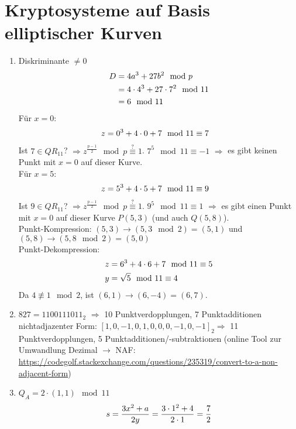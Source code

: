 \documentclass{article}
\begin{document}
	\section*{Kryptosysteme auf Basis elliptischer Kurven}
	\begin{enumerate}[label=(\alph*)]
		\item Diskriminante $\neq 0$
		\begin{align}
			D &= 4a^3 + 27b^2 \mod p \notag \\
			&= 4\cdot 4^3 + 27\cdot 7^2\mod 11 \notag \\
			&= 6 \mod 11 \notag
		\end{align}
		Für $x = 0$:
		\begin{align}
			z &= 0^3 + 4\cdot 0 + 7 \mod 11 \equiv 7 \notag
		\end{align}
		Ist $7\in QR_{11}$? $\Rightarrow z^{\frac{p-1}{2}}\mod p\overset{?}{\equiv} 1$. $7^5\mod 11\equiv -1$ $\Rightarrow$ es gibt keinen Punkt mit $x=0$ auf dieser Kurve. \\
		Für $x=5$:
		\begin{align}
			z &= 5^3 + 4\cdot 5 + 7 \mod 11 \equiv 9 \notag
		\end{align}
		Ist $9\in QR_{11}$? $\Rightarrow z^{\frac{p-1}{2}}\mod p\overset{?}{\equiv} 1$. $9^5\mod 11\equiv 1$ $\Rightarrow$ es gibt einen Punkt mit $x=0$ auf dieser Kurve $P(5, 3)$ (und auch $Q(5,8)$). \\
		Punkt-Kompression: $(5,3) \to (5,3\mod 2) = (5,1)$ und $(5,8)\to(5,8\mod 2) = (5,0)$ \\
		Punkt-Dekompression:
		\begin{align}
			z &= 6^3 + 4\cdot 6 + 7 \mod 11 \equiv 5 \notag \\
			y &= \sqrt{5} \mod 11 \equiv 4 \notag
		\end{align}
		Da $4\not\equiv 1 \mod 2$, ist $(6,1)\to (6,-4) = (6,7)$.
		\item $827 = 1100111011_2$ $\Rightarrow$ 10 Punktverdopplungen, 7 Punktadditionen \\
		nichtadjazenter Form: $[1,0,-1,0,1,0,0,0,-1,0,-1]_2 \Rightarrow$ 11 Punktverdopplungen, 5 Punktadditionen/-subtraktionen (online Tool zur Umwandlung Dezimal $\to$ NAF: \url{https://codegolf.stackexchange.com/questions/235319/convert-to-a-non-adjacent-form})
		\item $Q_A = 2\cdot (1,1)\mod 11$
		\begin{align}
			s &= \frac{3x^2 + a}{2y} = \frac{3\cdot 1^2 + 4}{2\cdot 1} = \frac{7}{2} \notag \\

\end{align}
\end{enumerate}
\end{document}
